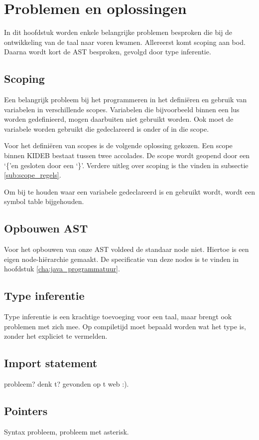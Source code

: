 \chapter{Problemen en oplossingen} %
\label{cha:problemen_en_oplossingen}
In dit hoofdstuk worden enkele belangrijke problemen besproken die bij de ontwikkeling van de taal naar voren kwamen. Allereerst komt scoping aan bod. Daarna wordt kort de AST besproken, gevolgd door type inferentie. 
\section{Scoping} %
\label{sec:scoping}
Een belangrijk probleem bij het programmeren in het defini\"eren en gebruik van variabelen in verschillende scopes. Variabelen die bijvoorbeeld binnen een lus worden gedefinieerd, mogen daarbuiten niet gebruikt worden. Ook moet de variabele worden gebruikt die gedeclareerd is onder of in die scope.

Voor het defini\"eren van scopes is de volgende oplossing gekozen. Een scope binnen KIDEB bestaat tussen twee accolades. De scope wordt geopend door een \textquoteleft\{\textquoteright en gesloten door een \textquoteleft\}\textquoteright. Verdere uitleg over scoping is the vinden in subsectie \ref{sub:scope_regels}.

Om bij te houden waar een variabele gedeclareerd is en gebruikt wordt, wordt een symbol table bijgehouden. 

\section{Opbouwen AST} %
\label{sec:opbouwen_ast}
Voor het opbouwen van onze AST voldeed de standaar node niet. Hiertoe is een eigen node-hi\"erarchie gemaakt. De specificatie van deze nodes is te vinden in hoofdstuk \ref{cha:java_programmatuur}.

\section{Type inferentie} %
\label{sec:type_inferentie}
Type inferentie is een krachtige toevoeging voor een taal, maar brengt ook problemen met zich mee. Op compiletijd moet bepaald worden wat het type is, zonder het expliciet te vermelden.

\section{Import statement} %
\label{sec:import_statement}
probleem? denk t? gevonden op t web :).

\section{Pointers} %
\label{sec:pointers}
Syntax probleem, probleem met asterisk. \textasteriskcentered

\clearpage